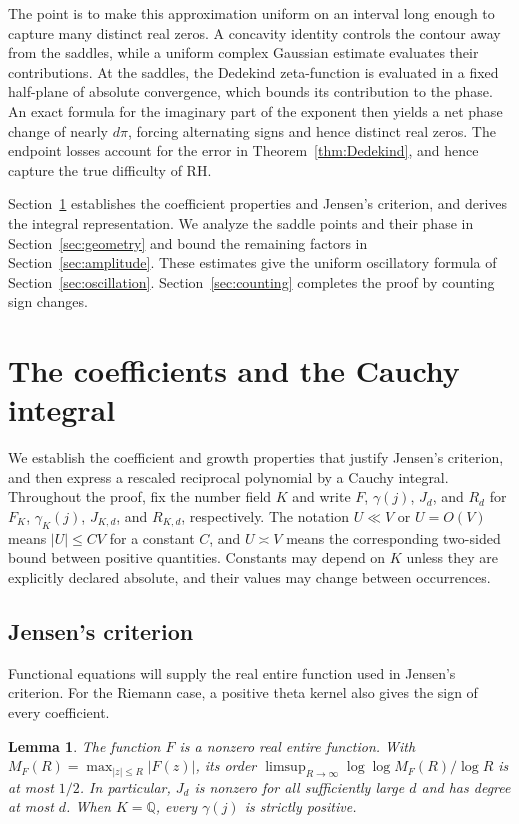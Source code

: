 \documentclass[11pt,reqno]{amsart}
\numberwithin{equation}{section}
\newtheorem{lemma}[theorem]{Lemma}
\begin{document}
The point is to make this approximation uniform on an interval
long enough to capture many distinct real zeros. A concavity identity
controls the contour away from the saddles, while a uniform complex
Gaussian estimate evaluates their contributions. At the saddles,
the Dedekind zeta-function is evaluated in a fixed half-plane of
absolute convergence, which bounds its contribution to the phase.
An exact formula for the imaginary part of the exponent then yields
a net phase change of nearly $d\pi$, forcing alternating signs and
hence distinct real zeros. The endpoint losses account for the
error in Theorem~\ref{thm:Dedekind}, and hence capture the true difficulty of RH.

Section~\ref{sec:preliminaries} establishes the coefficient
properties and Jensen's criterion, and derives the integral
representation. We analyze the saddle points and their phase in
Section~\ref{sec:geometry} and bound the remaining factors in
Section~\ref{sec:amplitude}. These estimates give the uniform
oscillatory formula of Section~\ref{sec:oscillation}.
Section~\ref{sec:counting} completes the proof by counting sign
changes.


\section{The coefficients and the Cauchy integral}\label{sec:preliminaries}


We establish the coefficient and growth properties that justify
Jensen's criterion, and then express a rescaled reciprocal polynomial
by a Cauchy integral. Throughout the proof, fix the number field $K$
and write $F$, $\gamma(j)$, $J_d$, and $R_d$ for $F_K$,
$\gamma_K(j)$, $J_{K,d}$, and $R_{K,d}$, respectively.
The notation $U\ll V$ or $U=O(V)$ means $|U|\le CV$ for a
constant $C$, and $U\asymp V$ means the corresponding two-sided
bound between positive quantities. Constants may depend on $K$
unless they are explicitly declared absolute, and their values
may change between occurrences.

\subsection{Jensen's criterion}

Functional equations will supply the real entire function used in
Jensen's criterion. For the Riemann case, a positive theta kernel
also gives the sign of every coefficient.

\begin{lemma}\label{lem:positive-growth}
The function $F$ is a nonzero real entire function. With
$M_F(R)=\max_{|z|\le R}|F(z)|$, its order
$\limsup_{R\to\infty}\log\log M_F(R)/\log R$ is at most $1/2$.
In particular, $J_d$ is nonzero for all sufficiently large
$d$ and has degree at most $d$. When $K=\mathbb Q$, every
$\gamma(j)$ is strictly positive.
\end{lemma}
\end{document}
